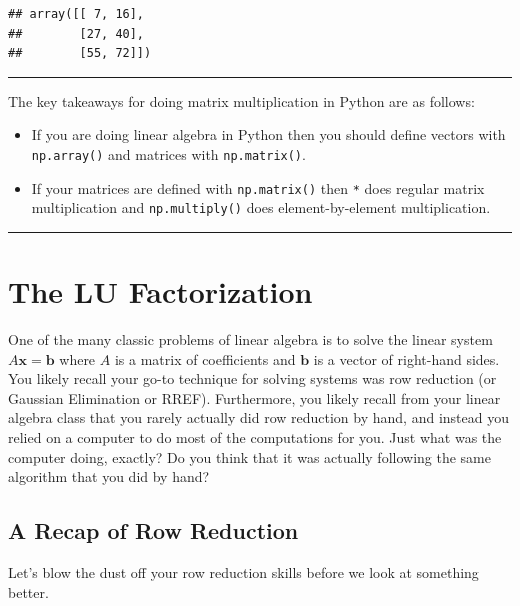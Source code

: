 \documentclass[
]{book}
\providecommand{\tightlist}{%
  \setlength{\itemsep}{0pt}\setlength{\parskip}{0pt}}
\theoremstyle{definition}
\theoremstyle{definition}
\theoremstyle{definition}
\theoremstyle{remark}
\begin{document}
\begin{verbatim}
## array([[ 7, 16],
##        [27, 40],
##        [55, 72]])
\end{verbatim}

\begin{center}\rule{0.5\linewidth}{0.5pt}\end{center}

The key takeaways for doing matrix multiplication in Python are as follows:

\begin{itemize}
\tightlist
\item
  If you are doing linear algebra in Python then you should define vectors with \texttt{np.array()} and matrices with \texttt{np.matrix()}.
\item
  If your matrices are defined with \texttt{np.matrix()} then \texttt{*} does regular matrix multiplication and \texttt{np.multiply()} does element-by-element multiplication.
\end{itemize}

\begin{center}\rule{0.5\linewidth}{0.5pt}\end{center}

\hypertarget{the-lu-factorization}{%
\section{The LU Factorization}\label{the-lu-factorization}}

One of the many classic problems of linear algebra is to solve the
linear system \(A \boldsymbol{x} = \boldsymbol{b}\) where \(A\) is a matrix of coefficients and \(\boldsymbol{b}\) is a vector of right-hand sides. You likely recall your go-to technique for solving systems was row reduction (or Gaussian Elimination or RREF). Furthermore, you likely recall from your linear algebra class that you rarely actually did row reduction by hand, and instead you relied on a computer to do most of the computations for you. Just what was the computer doing, exactly? Do you think that it was actually following the same algorithm that you did by hand?

\hypertarget{a-recap-of-row-reduction}{%
\subsection{A Recap of Row Reduction}\label{a-recap-of-row-reduction}}

Let's blow the dust off your row reduction skills before we look at something better.
\end{document}
